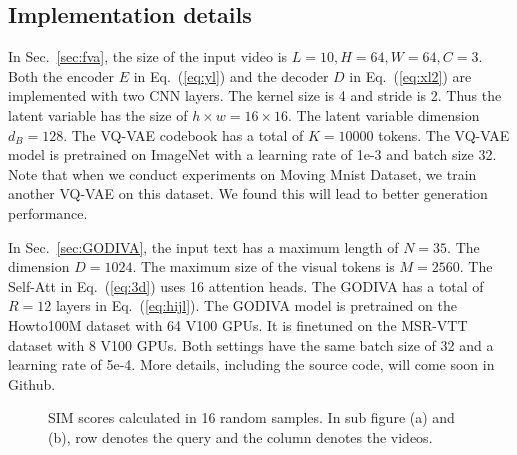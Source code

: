 \documentclass{article}
\begin{document}
\subsection{Implementation details}
In Sec.~\ref{sec:fva}, the size of the input video is $L=10, H=64, W=64, C=3$. Both the encoder $E$ in Eq.~(\ref{eq:yl}) and the decoder $D$ in Eq.~(\ref{eq:xl2}) are implemented with two CNN layers. The kernel size is 4 and stride is 2. Thus the latent variable has the size of $h\times w=16\times 16$. The latent variable dimension $d_B=128$. The VQ-VAE codebook has a total of $K=10000$ tokens. The VQ-VAE model is pretrained on ImageNet with a learning rate of 1e-3 and batch size 32. Note that when we conduct experiments on Moving Mnist Dataset, we train another VQ-VAE on this dataset. We found this will lead to better generation performance.

In Sec.~\ref{sec:GODIVA}, the input text has a maximum length of $N=35$. The dimension $D=1024$. The maximum size of the visual tokens is $M=2560$. The Self-Att in Eq.~(\ref{eq:3d}) uses 16 attention heads. The GODIVA has a total of $R=12$ layers in Eq.~(\ref{eq:hijl}). The GODIVA model is pretrained on the Howto100M dataset with 64 V100 GPUs. It is finetuned on the MSR-VTT dataset with 8 V100 GPUs. Both settings have the same batch size of 32 and a learning rate of 5e-4. More details, including the source code, will come soon in Github.



\begin{figure}\centering
    \qquad
    \caption{SIM scores calculated in 16 random samples. In sub figure (a) and (b), row denotes the query and the column denotes the videos.}\label{fig:matrix}\end{figure}
\end{document}
